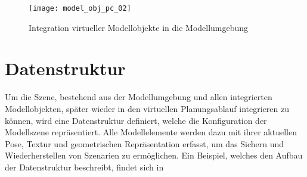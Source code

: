 \prever{
}

\begin{figure}[ht]
	\begin{center}
	\texttt{[image: model\_obj\_pc\_02]}
	\caption{Integration virtueller Modellobjekte in die Modellumgebung}
	\label{fig.modobj}
	\end{center}
\end{figure}



\section{Datenstruktur}
Um die Szene, bestehend aus der Modellumgebung und allen integrierten Modellobjekten, später wieder in den virtuellen Planungsablauf integrieren zu können, wird eine Datenstruktur definiert, welche die Konfiguration der Modellszene repräsentiert. Alle Modellelemente werden dazu mit ihrer aktuellen Pose, Textur und geometrischen Repräsentation erfasst, um das Sichern und Wiederherstellen von Szenarien zu ermöglichen. Ein Beispiel, welches den Aufbau der Datenstruktur beschreibt, findet sich in \\